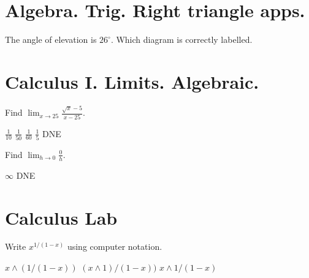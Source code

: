 \documentclass[addpoints]{exam}
\begin{document}
\begin{questions}
\section{Algebra. Trig. Right triangle apps.}
\question The angle of elevation is $26^\circ$. Which diagram is correctly labelled.


\section{Calculus I. Limits. Algebraic.}
\question Find $\lim_{x\to 25} \frac{\sqrt x-5}{x-25}$. \qquad\qquad
\begin{oneparchoices}
	\correctchoice $\frac1{10}$
	\choice $\frac1{50}$ %
	\choice $\frac1{60}$
	\choice $\frac15$
	\choice DNE
	\end{oneparchoices}
\question Find $\lim_{h\to0} \frac0h$. \qquad\qquad
\begin{oneparchoices}
	\choice $\infty$
	\choice DNE
	\end{oneparchoices}


\section{Calculus Lab}
\question Write $x^{1/(1-x)}$ using computer notation.
\begin{oneparchoices}
	\correctchoice $x\wedge(1/(1-x))$
	\choice $(x\wedge 1)/(1-x))$
	\choice $x\wedge 1/(1-x)$
	\end{oneparchoices}

\end{questions}
\end{document}
